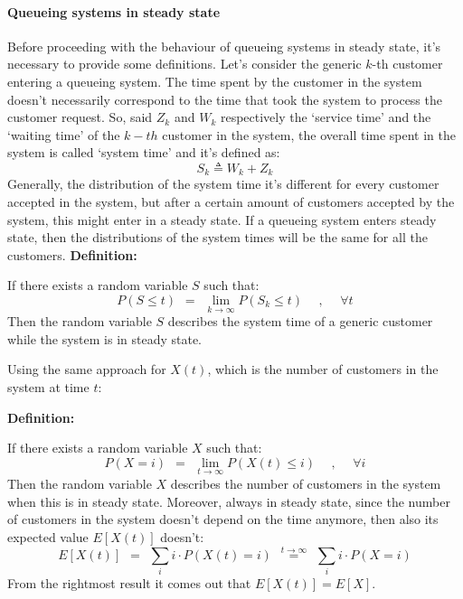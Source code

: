 \documentclass[12pt,a4paper]{article}
\begin{document}
\paragraph{Queueing systems in steady state}
Before proceeding with the behaviour of queueing systems in steady state, it's necessary to provide some definitions. Let's consider the generic $k$-th customer entering a queueing system. The time spent by the customer in the system doesn't necessarily correspond to the time that took the system to process the customer request. So, said $Z_k$ and $W_k$ respectively the `service time' and the `waiting time' of the $k-th$ customer in the system, the overall time spent in the system is called `system time' and it's defined as:
$$
S_k \triangleq W_k+Z_k
$$ 
Generally, the distribution of the system time it's different for every customer accepted in the system, but after a certain amount of customers accepted by the system, this might enter in a steady state. If a queueing system enters steady state, then the distributions of the system times will be the same for all the customers.
\newpage
\noindent
\textbf{Definition:}

\bigskip\noindent
If there exists a random variable $S$ such that:
$$
P\left( S\leq t\right)
\hspace{5pt}
=
\hspace{5pt}
\lim_{k\rightarrow \infty}
{P\left( S_k\leq t\right)}
\hspace{15pt}
,
\hspace{15pt}
\forall t
$$
Then the random variable $S$ describes the system time of a generic customer while the system is in steady state.

\bigskip\noindent
Using the same approach for $X(t)$, which is the number of customers in the system at time $t$:

\bigskip
\noindent
\textbf{Definition:}

\bigskip\noindent
If there exists a random variable $X$ such that:
$$
P\left( X=i\right)
\hspace{5pt}
=
\hspace{5pt}
\lim_{t\rightarrow \infty}
{P\left( X(t)\leq i\right)}
\hspace{15pt}
,
\hspace{15pt}
\forall i
$$
\noindent
Then the random variable $X$ describes the number of customers in the system when this is in steady state. Moreover, always in steady state, since the number of customers in the system doesn't depend on the time anymore, then also its expected value $E\left[X(t)\right]$ doesn't:
$$
E\left[X(t)\right]
\hspace{5pt}
=
\hspace{5pt}
\sum_{i}
{
i \cdot P\left(X(t)=i\right)
}
\hspace{5pt}
\overset{t\rightarrow \infty}{=}
\hspace{5pt}
\sum_{i}
{
i \cdot P\left(X=i\right)
}
$$
From the rightmost result it comes out that $E\left[X(t)\right]=E\left[X\right]$.
\end{document}
